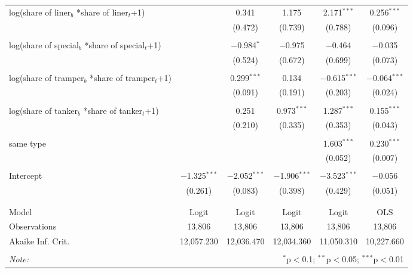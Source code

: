 \begin{tabular}{@{\extracolsep{5pt}}lccccc}
 log(share of liner$_{b}$ *share of liner$_{t}$+1) &  & 0.341 & 1.175 & 2.171$^{***}$ & 0.256$^{***}$ \\ 
  &  & (0.472) & (0.739) & (0.788) & (0.096) \\ 
  & & & & & \\ 
 log(share of special$_{b}$ *share of special$_{t}$+1) &  & $-$0.984$^{*}$ & $-$0.975 & $-$0.464 & $-$0.035 \\ 
  &  & (0.524) & (0.672) & (0.699) & (0.073) \\ 
  & & & & & \\ 
 log(share of tramper$_{b}$ *share of tramper$_{t}$+1) &  & 0.299$^{***}$ & 0.134 & $-$0.615$^{***}$ & $-$0.064$^{***}$ \\ 
  &  & (0.091) & (0.191) & (0.203) & (0.024) \\ 
  & & & & & \\ 
 log(share of tanker$_{b}$ *share of tanker$_{t}$+1) &  & 0.251 & 0.973$^{***}$ & 1.287$^{***}$ & 0.155$^{***}$ \\ 
  &  & (0.210) & (0.335) & (0.353) & (0.043) \\ 
  & & & & & \\ 
 same type &  &  &  & 1.603$^{***}$ & 0.230$^{***}$ \\ 
  &  &  &  & (0.052) & (0.007) \\ 
  & & & & & \\ 
 Intercept & $-$1.325$^{***}$ & $-$2.052$^{***}$ & $-$1.906$^{***}$ & $-$3.523$^{***}$ & $-$0.056 \\ 
  & (0.261) & (0.083) & (0.398) & (0.429) & (0.051) \\ 
  & & & & & \\ 
\hline \\[-1.8ex] 
Model & Logit & Logit & Logit & Logit & OLS \\ 
Observations & 13,806 & 13,806 & 13,806 & 13,806 & 13,806 \\ 
Akaike Inf. Crit. & 12,057.230 & 12,036.470 & 12,034.360 & 11,050.310 & 10,227.660 \\ 
\hline 
\hline \\[-1.8ex] 
\textit{Note:}  & \multicolumn{5}{r}{$^{*}$p$<$0.1; $^{**}$p$<$0.05; $^{***}$p$<$0.01} \\ 
\end{tabular} 

